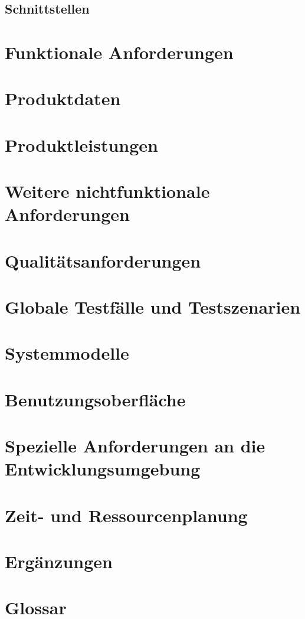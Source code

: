 \documentclass[a4paper,10pt]{article}
\begin{document}
\subsection{Schnittstellen}
\section{Funktionale Anforderungen}
\section{Produktdaten}
\section{Produktleistungen}
\section{Weitere nichtfunktionale Anforderungen}
\section{Qualitätsanforderungen}
\section{Globale Testfälle und Testszenarien}
\section{Systemmodelle}
\section{Benutzungsoberfläche}
\section{Spezielle Anforderungen an die Entwicklungsumgebung}
\section{Zeit- und Ressourcenplanung}
\section{Ergänzungen}
\section{Glossar}
\end{document}
